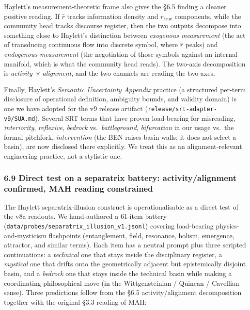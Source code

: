 \documentclass[
  11pt]{article}
\begin{document}
Haylett's measurement-theoretic frame also gives the §6.5 finding a
cleaner positive reading. If \(\hat{r}\) tracks information density and
\(r_\text{true}\) components, while the community head tracks discourse
register, then the two outputs decompose into something close to
Haylett's distinction between \emph{exogenous measurement} (the act of
transducing continuous flow into discrete symbol, where \(\hat{r}\)
peaks) and \emph{endogenous measurement} (the negotiation of those
symbols against an internal manifold, which is what the community head
reads). The two-axis decomposition is \emph{activity × alignment}, and
the two channels are reading the two axes.

Finally, Haylett's \emph{Semantic Uncertainty Appendix} practice (a
structured per-term disclosure of operational definition, ambiguity
bounds, and validity domain) is one we have adopted for the v9 release
artifact (\texttt{release/srt-adapter-v9/SUA.md}). Several SRT terms
that have proven load-bearing for misreading, \emph{interiority},
\emph{reflexive}, \emph{bedrock} vs.~\emph{battleground},
\emph{bifurcation} in our usage vs.~the formal pitchfork,
\emph{intervention} (the BEN raises basin walls; it does not select a
basin), are now disclosed there explicitly. We treat this as an
alignment-relevant engineering practice, not a stylistic one.

\subsubsection{6.9 Direct test on a separatrix battery:
activity/alignment confirmed, MAH reading
constrained}\label{direct-test-on-a-separatrix-battery-activityalignment-confirmed-mah-reading-constrained}

The Haylett separatrix-illusion construct is operationalisable as a
direct test of the v8a readouts. We hand-authored a 61-item battery
(\texttt{data/probes/separatrix\_illusion\_v1.jsonl}) covering
load-bearing physics-and-mysticism flashpoints (entanglement, field,
resonance, holism, emergence, attractor, and similar terms). Each item
has a neutral prompt plus three scripted continuations: a
\emph{technical} one that stays inside the disciplinary register, a
\emph{mystical} one that drifts onto the geometrically adjacent but
epistemically disjoint basin, and a \emph{bedrock} one that stays inside
the technical basin while making a coordinating philosophical move (in
the Wittgensteinian / Quinean / Cavellian sense). Three predictions
follow from the §6.5 activity/alignment decomposition together with the
original §3.3 reading of MAH:
\end{document}
